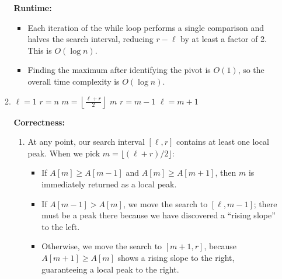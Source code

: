 \documentclass{article}
\begin{document}
\begin{enumerate}
\begin{enumerate}
            \textbf{Runtime:}
            \begin{itemize}
                \item Each iteration of the while loop performs a single comparison and halves the search interval, reducing $r - \ell$ by at least a factor of 2. This is $O(\log n)$.
                \item Finding the maximum after identifying the pivot is $O(1)$, so the overall time complexity is $O(\log n)$.
            \end{itemize}
        \item \begin{algorithm}
            \begin{algorithmic}[1]
                    \State $\ell = 1$
                    \State $r = n$
                        \State $m = \left\lfloor \frac{\ell + r}{2} \right\rfloor$
                            \State \Return $m$
                            \State $r = m - 1$
                        \Else
                            \State $\ell = m + 1$
                        \EndIf
                    \EndWhile
                \EndFunction
            \end{algorithmic}
            \end{algorithm}
            \pagebreak
            \textbf{Correctness:}
            \begin{enumerate}
                \item At any point, our search interval $[\ell, r]$ contains at least one local peak. When we pick $m = \lfloor (\ell + r)/2 \rfloor$:
                \begin{itemize}
                    \item If $A[m] \ge A[m-1]$ and $A[m] \ge A[m+1]$, then $m$ is immediately returned as a local peak.
                    \item If $A[m-1] > A[m]$, we move the search to $[\ell, m-1]$; there must be a peak there because we have discovered a ``rising slope'' to the left.
                    \item Otherwise, we move the search to $[m+1, r]$, because $A[m+1] \ge A[m]$ shows a rising slope to the right, guaranteeing a local peak to the right.
                \end{itemize}
                

\end{enumerate}
\end{enumerate}
\end{enumerate}
\end{document}
